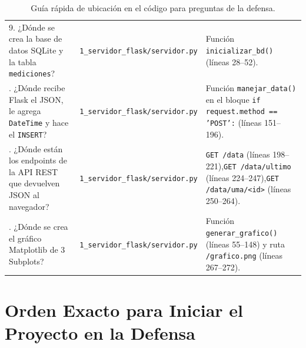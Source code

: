 \documentclass[11pt,a4paper]{article}
\begin{document}
\begin{table}[h!]
\begin{tabular}{@{}p{5.8cm}p{4.6cm}p{5.2cm}@{}}
9. ¿Dónde se crea la base de datos SQLite y la tabla \texttt{mediciones}? & \texttt{1\_servidor\_flask/\newline servidor.py} & Función \texttt{inicializar\_bd()} (líneas 28--52). \\ \addlinespace
10. ¿Dónde recibe Flask el JSON, le agrega \texttt{DateTime} y hace el \texttt{INSERT}? & \texttt{1\_servidor\_flask/\newline servidor.py} & Función \texttt{manejar\_data()} en el bloque \texttt{if request.method == 'POST':} (líneas 151--196). \\ \addlinespace
11. ¿Dónde están los endpoints de la API REST que devuelven JSON al navegador? & \texttt{1\_servidor\_flask/\newline servidor.py} & \texttt{GET /data} (líneas 198--221),\newline \texttt{GET /data/ultimo} (líneas 224--247),\newline \texttt{GET /data/uma/<id>} (líneas 250--264). \\ \addlinespace
12. ¿Dónde se crea el gráfico Matplotlib de 3 Subplots? & \texttt{1\_servidor\_flask/\newline servidor.py} & Función \texttt{generar\_grafico()} (líneas 55--148) y ruta \texttt{/grafico.png} (líneas 267--272). \\ \bottomrule
\end{tabular}
\caption{Guía rápida de ubicación en el código para preguntas de la defensa.}
\end{table}

\section{Orden Exacto para Iniciar el Proyecto en la Defensa}
\end{document}
